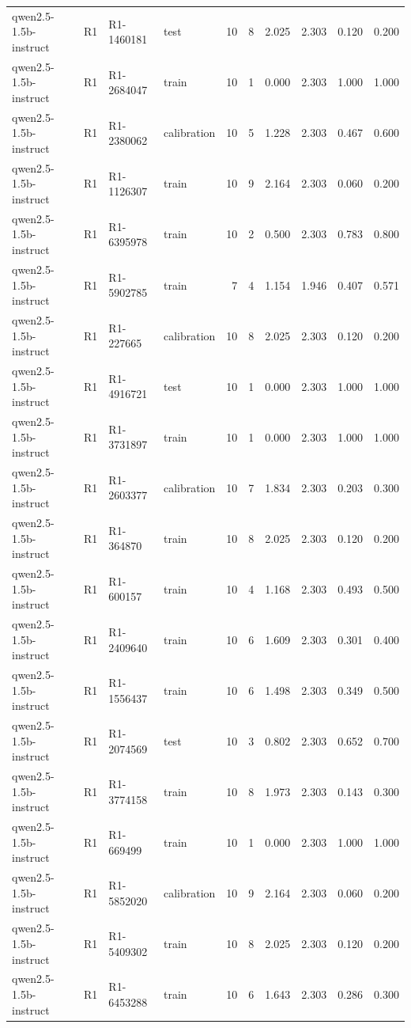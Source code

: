 \begin{table}
\begin{tabular}{llllrrrrrr}
qwen2.5-1.5b-instruct & R1 & R1-1460181 & test & 10 & 8 & 2.025 & 2.303 & 0.120 & 0.200 \\
qwen2.5-1.5b-instruct & R1 & R1-2684047 & train & 10 & 1 & 0.000 & 2.303 & 1.000 & 1.000 \\
qwen2.5-1.5b-instruct & R1 & R1-2380062 & calibration & 10 & 5 & 1.228 & 2.303 & 0.467 & 0.600 \\
qwen2.5-1.5b-instruct & R1 & R1-1126307 & train & 10 & 9 & 2.164 & 2.303 & 0.060 & 0.200 \\
qwen2.5-1.5b-instruct & R1 & R1-6395978 & train & 10 & 2 & 0.500 & 2.303 & 0.783 & 0.800 \\
qwen2.5-1.5b-instruct & R1 & R1-5902785 & train & 7 & 4 & 1.154 & 1.946 & 0.407 & 0.571 \\
qwen2.5-1.5b-instruct & R1 & R1-227665 & calibration & 10 & 8 & 2.025 & 2.303 & 0.120 & 0.200 \\
qwen2.5-1.5b-instruct & R1 & R1-4916721 & test & 10 & 1 & 0.000 & 2.303 & 1.000 & 1.000 \\
qwen2.5-1.5b-instruct & R1 & R1-3731897 & train & 10 & 1 & 0.000 & 2.303 & 1.000 & 1.000 \\
qwen2.5-1.5b-instruct & R1 & R1-2603377 & calibration & 10 & 7 & 1.834 & 2.303 & 0.203 & 0.300 \\
qwen2.5-1.5b-instruct & R1 & R1-364870 & train & 10 & 8 & 2.025 & 2.303 & 0.120 & 0.200 \\
qwen2.5-1.5b-instruct & R1 & R1-600157 & train & 10 & 4 & 1.168 & 2.303 & 0.493 & 0.500 \\
qwen2.5-1.5b-instruct & R1 & R1-2409640 & train & 10 & 6 & 1.609 & 2.303 & 0.301 & 0.400 \\
qwen2.5-1.5b-instruct & R1 & R1-1556437 & train & 10 & 6 & 1.498 & 2.303 & 0.349 & 0.500 \\
qwen2.5-1.5b-instruct & R1 & R1-2074569 & test & 10 & 3 & 0.802 & 2.303 & 0.652 & 0.700 \\
qwen2.5-1.5b-instruct & R1 & R1-3774158 & train & 10 & 8 & 1.973 & 2.303 & 0.143 & 0.300 \\
qwen2.5-1.5b-instruct & R1 & R1-669499 & train & 10 & 1 & 0.000 & 2.303 & 1.000 & 1.000 \\
qwen2.5-1.5b-instruct & R1 & R1-5852020 & calibration & 10 & 9 & 2.164 & 2.303 & 0.060 & 0.200 \\
qwen2.5-1.5b-instruct & R1 & R1-5409302 & train & 10 & 8 & 2.025 & 2.303 & 0.120 & 0.200 \\
qwen2.5-1.5b-instruct & R1 & R1-6453288 & train & 10 & 6 & 1.643 & 2.303 & 0.286 & 0.300 \\

\end{tabular}
\end{table}
